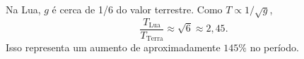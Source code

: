 Na Lua, $g$ é cerca de 1/6 do valor terrestre. Como $T\propto1/\sqrt{g}$,
\[
\frac{T_{\text{Lua}}}{T_{\text{Terra}}} \approx \sqrt{6} \approx 2{,}45.
\]
Isso representa um aumento de aproximadamente $145\%$ no período. 